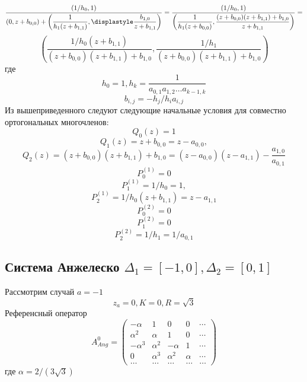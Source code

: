 \documentclass[12pt, a4paper]{report}
\begin{document}
$$
\displaystyle\frac{(1/h_0,1)}{(0,z+b_{0,0}) +  \left(\displaystyle\frac{1}{h_1(z+b_{1,1})},\displastyle\frac{b_{1,0}}{z+b_{1,1}}\right) }=
\displaystyle\frac{(1/h_0,1)}
{\left(\displaystyle\frac{1}{h_1(z+b_{0,0})} , \displaystyle\frac{(z+b_{0,0})(z+b_{1,1})+b_{1,0}}{z+b_{1,1}}\right) }=
$$
$$ 
\left( \displaystyle\frac{1/h_0(z+b_{1,1})}{(z+b_{0,0})(z+b_{1,1})+b_{1,0}}, 
\displaystyle\frac{1/h_1}{(z+b_{0,0})(z+b_{1,1})+b_{1,0}} \right) 
$$
где
$$
h_0=1, 
h_k=\displaystyle\frac{1}{a_{0,1}a_{1,2}\ldots a_{k-1,k}}
$$
$$
b_{i,j}=-h_j/h_i a_{i,j}
$$
Из вышеприведенного следуют следующие начальные условия для совместно ортогональных многочленов:
$$
Q_0(z)=1
$$
$$
Q_1(z)=z+b_{0,0}=z-a_{0,0}, 
$$
$$
Q_2(z)=(z+b_{0,0})(z+b_{1,1})+b_{1,0}=(z-a_{0,0})(z-a_{1,1})-\frac{a_{1,0}}{a_{0,1}}
$$
$$
P_0^{(1)}=0
$$
$$
P_1^{(1)}=1/h_0=1, 
$$
$$
P_2^{(1)}=1/h_0(z+b_{1,1})=z-a_{1,1}
$$
$$
P_0^{(2)}=0
$$
$$
P_1^{(2)}=0
$$
$$
P_2^{(2)}=1/h_1=1/a_{0,1}
$$


\subsection {Система Анжелеско $\Delta_1=[-1,0], \Delta_2 =[0,1]$}
Рассмотрим случай $a=-1$ \\
$$
z_a=0, K=0, R = \sqrt{3}
$$
Референсный оператор
$$
A^0_{Ang}=
\left(\begin{array}{cccccccccccc}
-\alpha & 1 & 0 & 0 &  \cdots \\
\alpha^2 & \alpha & 1 & 0 &  \cdots \\
-\alpha^3 & \alpha^2 & -\alpha & 1 &  \cdots \\
0 & \alpha^3 & \alpha^2 & \alpha &  \cdots \\
\ldots & \ldots & \ldots & \ldots & \ldots
\end{array}\right)
$$
где $\alpha=2/(3\sqrt{3})$
\end{document}
